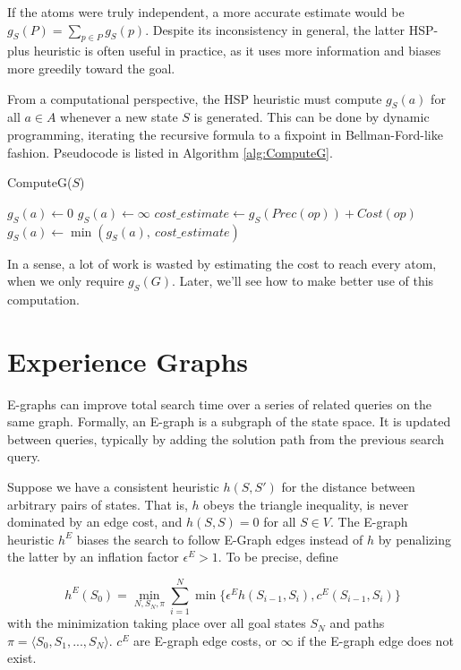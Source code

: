\documentclass[letterpaper]{article}
\begin{document}
If the atoms were truly independent, a more accurate estimate would be $g_S(P) = \sum_{p\in P} g_S(p)$.
Despite its inconsistency in general, the latter HSP-plus heuristic is often useful in practice, as it uses more information and biases more greedily toward the goal.

From a computational perspective, the HSP heuristic must compute $g_S(a)$ for all $a\in A$ whenever a new state $S$ is generated.
This can be done by dynamic programming, iterating the recursive formula to a fixpoint in Bellman-Ford-like fashion.
Pseudocode is listed in Algorithm \ref{alg:ComputeG}.

\begin{algorithm}
\caption{ComputeG($S$)}
\label{alg:ComputeG}
\begin{algorithmic}
\STATE $g_S(a) \leftarrow 0$
\ELSE
\STATE $g_S(a) \leftarrow \infty$
\ENDIF
\ENDFOR
\REPEAT
{}
\STATE $cost\_estimate \leftarrow g_S(Prec(op)) + Cost(op)$
\STATE $g_S(a) \leftarrow \min \left(g_S(a),~cost\_estimate\right)$
\ENDFOR
\ENDFOR
{}
\end{algorithmic}
\end{algorithm}

In a sense, a lot of work is wasted by estimating the cost to reach every atom, when we only require $g_S(G)$.
Later, we'll see how to make better use of this computation.

\section{Experience Graphs}

E-graphs can improve total search time over a series of related queries on the same graph.
Formally, an E-graph is a subgraph of the state space.
It is updated between queries, typically by adding the solution path from the previous search query.

Suppose we have a consistent heuristic $h(S,S')$ for the distance between arbitrary pairs of states.
That is, $h$ obeys the triangle inequality, is never dominated by an edge cost, and $h(S,S) = 0$ for all $S\in V$.
The E-graph heuristic $h^E$ biases the search to follow E-Graph edges instead of $h$ by penalizing the latter by an inflation factor $\epsilon^E > 1$.
To be precise, define

\[h^E(S_0) = \min_{N,S_N,\pi} \sum_{i=1}^N \min \{\epsilon^E h(S_{i-1},S_i),c^E(S_{i-1},S_i)\}\]
with the minimization taking place over all goal states $S_N$ and paths $\pi = \langle S_0,S_1,...,S_N \rangle$. $c^E$ are E-graph edge costs, or $\infty$ if the E-graph edge does not exist.
\end{document}
